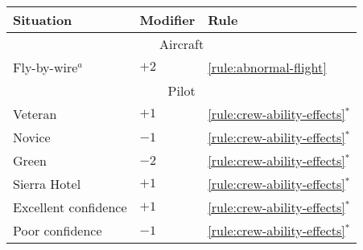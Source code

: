 \begin{onecolumntablefloat}[tp]
{}{

\begin{onecolumntable}
\begin{tabularx}{0.8\linewidth}{Xll}
Situation&Modifier&Rule\\
\toprule
\multicolumn{3}{c}{Aircraft}\\
\midrule
Fly-by-wire$^a$             &$+2$&\ref{rule:abnormal-flight}\\
\midrule
\multicolumn{3}{c}{Pilot}\\
\midrule
Veteran                 &$+1$&\ref{rule:crew-ability-effects}$^*$\\
Novice                  &$-1$&\ref{rule:crew-ability-effects}$^*$\\
Green                   &$-2$&\ref{rule:crew-ability-effects}$^*$\\
Sierra Hotel            &$+1$&\ref{rule:crew-ability-effects}$^*$\\
Excellent confidence    &$+1$&\ref{rule:crew-ability-effects}$^*$\\
Poor confidence         &$-1$&\ref{rule:crew-ability-effects}$^*$\\
\bottomrule
\end{tabularx}
\end{onecolumntable}

\vspace{\floatsep}

}
\end{onecolumntablefloat}
